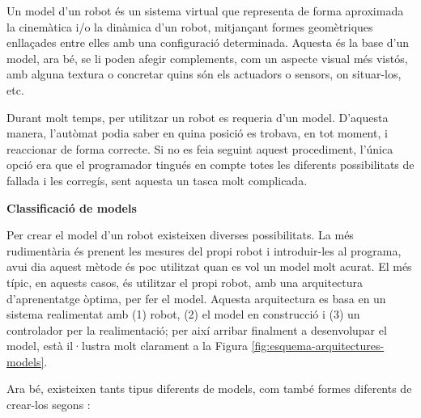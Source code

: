 \documentclass[12pt,a4paper,final,twoside]{article}
\begin{document}
Un model d'un robot és un sistema virtual que representa de forma aproximada la cinemàtica i/o la dinàmica d'un robot, mitjançant formes geomètriques enllaçades entre elles amb una configuració determinada. Aquesta és la base d'un model, ara bé, se li poden afegir complements, com un aspecte visual més vistós, amb alguna textura o concretar quins són els actuadors o sensors, on situar-los, etc.

Durant molt temps, per utilitzar un robot es requeria d'un model. D'aquesta manera, l'autòmat podia saber en quina posició es trobava, en tot moment, i reaccionar de forma correcte. Si no es feia seguint aquest procediment, l'única opció era que el programador tingués en compte totes les diferents possibilitats de fallada i les corregís, sent aquesta un tasca molt complicada.  

\vspace{20pt}
\textbf{Classificació de models}

Per crear el model d'un robot existeixen diverses possibilitats. La més rudimentària és prenent les mesures del propi robot i introduir-les al programa, avui dia aquest mètode és poc utilitzat quan es vol un model molt acurat. El més típic, en aquests casos, és utilitzar el propi robot, amb una arquitectura d'aprenentatge òptima, per fer el model. Aquesta arquitectura es basa en un sistema realimentat amb (1) robot, (2) el model en construcció i (3) un controlador per la realimentació; per així arribar finalment a desenvolupar el model,  està il·lustra molt clarament a la Figura \ref{fig:esquema-arquitectures-models}.

Ara bé, existeixen tants tipus diferents de models, com també formes diferents de crear-los segons \cite{Nguyen-Tuong2011}:
\end{document}
